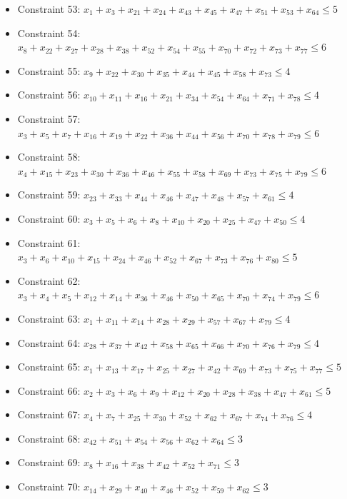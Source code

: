 \documentclass[11pt]{article}
\begin{document}
\begin{itemize}
\item Constraint 53: $x_{1} + x_{3} + x_{21} + x_{24} + x_{43} + x_{45} + x_{47} + x_{51} + x_{53} + x_{64} \le 5$
\item Constraint 54: $x_{8} + x_{22} + x_{27} + x_{28} + x_{38} + x_{52} + x_{54} + x_{55} + x_{70} + x_{72} + x_{73} + x_{77} \le 6$
\item Constraint 55: $x_{9} + x_{22} + x_{30} + x_{35} + x_{44} + x_{45} + x_{58} + x_{73} \le 4$
\item Constraint 56: $x_{10} + x_{11} + x_{16} + x_{21} + x_{34} + x_{54} + x_{64} + x_{71} + x_{78} \le 4$
\item Constraint 57: $x_{3} + x_{5} + x_{7} + x_{16} + x_{19} + x_{22} + x_{36} + x_{44} + x_{56} + x_{70} + x_{78} + x_{79} \le 6$
\item Constraint 58: $x_{4} + x_{15} + x_{23} + x_{30} + x_{36} + x_{46} + x_{55} + x_{58} + x_{69} + x_{73} + x_{75} + x_{79} \le 6$
\item Constraint 59: $x_{23} + x_{33} + x_{44} + x_{46} + x_{47} + x_{48} + x_{57} + x_{61} \le 4$
\item Constraint 60: $x_{3} + x_{5} + x_{6} + x_{8} + x_{10} + x_{20} + x_{25} + x_{47} + x_{50} \le 4$
\item Constraint 61: $x_{3} + x_{6} + x_{10} + x_{15} + x_{24} + x_{46} + x_{52} + x_{67} + x_{73} + x_{76} + x_{80} \le 5$
\item Constraint 62: $x_{3} + x_{4} + x_{5} + x_{12} + x_{14} + x_{36} + x_{46} + x_{50} + x_{65} + x_{70} + x_{74} + x_{79} \le 6$
\item Constraint 63: $x_{1} + x_{11} + x_{14} + x_{28} + x_{29} + x_{57} + x_{67} + x_{79} \le 4$
\item Constraint 64: $x_{28} + x_{37} + x_{42} + x_{58} + x_{65} + x_{66} + x_{70} + x_{76} + x_{79} \le 4$
\item Constraint 65: $x_{1} + x_{13} + x_{17} + x_{25} + x_{27} + x_{42} + x_{69} + x_{73} + x_{75} + x_{77} \le 5$
\item Constraint 66: $x_{2} + x_{3} + x_{6} + x_{9} + x_{12} + x_{20} + x_{28} + x_{38} + x_{47} + x_{61} \le 5$
\item Constraint 67: $x_{4} + x_{7} + x_{25} + x_{30} + x_{52} + x_{62} + x_{67} + x_{74} + x_{76} \le 4$
\item Constraint 68: $x_{42} + x_{51} + x_{54} + x_{56} + x_{62} + x_{64} \le 3$
\item Constraint 69: $x_{8} + x_{16} + x_{38} + x_{42} + x_{52} + x_{71} \le 3$
\item Constraint 70: $x_{14} + x_{29} + x_{40} + x_{46} + x_{52} + x_{59} + x_{62} \le 3$

\end{itemize}
\end{document}
